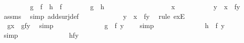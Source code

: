 \begin{isabellebody}
\ \ \ \ \ \ \isamarkupfalse%
\ {}{\isacharcolon}\ {\isachardoublequoteopen}g\ {\isasymcirc}\ f\ {\isacharequal}\ h\ {\isasymcirc}\ f{\isachardoublequoteclose}\isanewline
\ \ \ \ \ \ \isamarkupfalse%
\ {\isachardoublequoteopen}g\ {\isacharequal}\ h{\isachardoublequoteclose}\isanewline
\ \ \ \ \ \ \isamarkupfalse%
\ \ \isanewline
\ \ \ \ \ \ \ \ \isamarkupfalse%
\ x\isanewline
\ \ \ \ \ \ \ \ \isamarkupfalse%
\ {\isachardoublequoteopen}\ {\isasymexists}y\ {\isachardot}\ x\ {\isacharequal}\ f{\isacharparenleft}y{\isacharparenright}{\isachardoublequoteclose}\ \isamarkupfalse%
\ assms\ \isamarkupfalse%
\ {\isacharparenleft}simp\ add{\isacharcolon}surj{\isacharunderscore}def{\isacharparenright}\isanewline
\ \ \ \ \ \ \ \ \isamarkupfalse%
\ \isamarkupfalse%
\ \ {\isachardoublequoteopen}y{\isachardoublequoteclose}\ \ {}{\isacharcolon}{\isachardoublequoteopen}x\ {\isacharequal}\ f{\isacharparenleft}y{\isacharparenright}{\isachardoublequoteclose}\ \isamarkupfalse%
\ {\isacharparenleft}rule\ exE{\isacharparenright}\isanewline
\ \ \ \ \ \ \ \ \isamarkupfalse%
\ \isamarkupfalse%
\ \ {\isachardoublequoteopen}g{\isacharparenleft}x{\isacharparenright}\ {\isacharequal}\ g{\isacharparenleft}f{\isacharparenleft}y{\isacharparenright}{\isacharparenright}{\isachardoublequoteclose}\ \isamarkupfalse%
\ simp\isanewline
\ \ \ \ \ \ \ \ \isamarkupfalse%
\ \isamarkupfalse%
\ \ {\isachardoublequoteopen}{\isachardot}{\isachardot}{\isachardot}\ {\isacharequal}\ {\isacharparenleft}g\ {\isasymcirc}\ f{\isacharparenright}\ {\isacharparenleft}y{\isacharparenright}\ \ {\isachardoublequoteclose}\ \isamarkupfalse%
\ simp\isanewline
\ \ \ \ \ \ \ \ \isamarkupfalse%
\ \isamarkupfalse%
\ \ {\isachardoublequoteopen}{\isachardot}{\isachardot}{\isachardot}\ {\isacharequal}\ {\isacharparenleft}h\ {\isasymcirc}\ f{\isacharparenright}\ {\isacharparenleft}y{\isacharparenright}{\isachardoublequoteclose}\ \isamarkupfalse%
\ {}\ \isamarkupfalse%
\ simp\isanewline
\ \ \ \ \ \ \ \ \isamarkupfalse%
\ \isamarkupfalse%
\ \ {\isachardoublequoteopen}{\isachardot}{\isachardot}{\isachardot}\ {\isacharequal}\ h{\isacharparenleft}f{\isacharparenleft}y{\isacharparenright}{\isacharparenright}{\isachardoublequoteclose}\ \isamarkupfalse%

\end{isabellebody}
